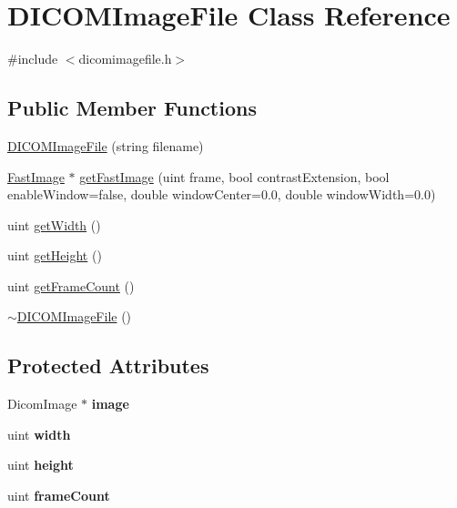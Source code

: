 \hypertarget{class_d_i_c_o_m_image_file}{
\section{DICOMImageFile Class Reference}
\label{class_d_i_c_o_m_image_file}
}


{\ttfamily \#include $<$dicomimagefile.h$>$}

\subsection*{Public Member Functions}
\begin{DoxyCompactItemize}
\item 
\hyperlink{class_d_i_c_o_m_image_file_ae4778b6e6ed2c36f47fe3e785b55bb2e}{DICOMImageFile} (string filename)
\item 
\hyperlink{class_fast_image}{FastImage} $\ast$ \hyperlink{class_d_i_c_o_m_image_file_aac6cfe1b8babedd17543fd3a8971f86b}{getFastImage} (uint frame, bool contrastExtension, bool enableWindow=false, double windowCenter=0.0, double windowWidth=0.0)
\item 
uint \hyperlink{class_d_i_c_o_m_image_file_a4eb4186345395c61c7964e588a08e057}{getWidth} ()
\item 
uint \hyperlink{class_d_i_c_o_m_image_file_abebf0dfb003c75c06c3955e65dd5b9a6}{getHeight} ()
\item 
uint \hyperlink{class_d_i_c_o_m_image_file_aec56b3e9d86b2af4206e38406714941f}{getFrameCount} ()
\item 
\hyperlink{class_d_i_c_o_m_image_file_af210a193559ee3287aa1f9c4bf13d3ab}{$\sim$DICOMImageFile} ()
\end{DoxyCompactItemize}
\subsection*{Protected Attributes}
\begin{DoxyCompactItemize}
\item 
\hypertarget{class_d_i_c_o_m_image_file_ac8700ef1684e13d0d0fe01e603294293}{
DicomImage $\ast$ {\bfseries image}}
\label{class_d_i_c_o_m_image_file_ac8700ef1684e13d0d0fe01e603294293}

\item 
\hypertarget{class_d_i_c_o_m_image_file_af62a20b7e1e3a7a33ddc848b429b64f8}{
uint {\bfseries width}}
\label{class_d_i_c_o_m_image_file_af62a20b7e1e3a7a33ddc848b429b64f8}

\item 
\hypertarget{class_d_i_c_o_m_image_file_ae751485a997fefa6136cfe40255a38c6}{
uint {\bfseries height}}
\label{class_d_i_c_o_m_image_file_ae751485a997fefa6136cfe40255a38c6}

\item 
\hypertarget{class_d_i_c_o_m_image_file_a445cb53cda79233bb1815a96bb3fa97b}{
uint {\bfseries frameCount}}
\label{class_d_i_c_o_m_image_file_a445cb53cda79233bb1815a96bb3fa97b}

\end{DoxyCompactItemize}


